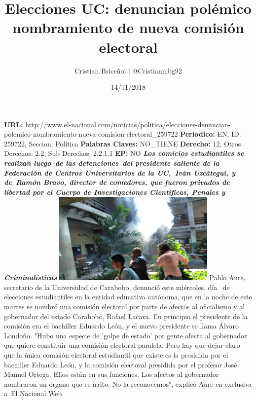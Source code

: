 \documentclass{article}%
\title{\textbf{Elecciones UC: denuncian polémico nombramiento de nueva comisión electoral}}%
\author{Cristian Briceñoi | @Cristianmbg92}%
\date{14/11/2018}%
\begin{document}
%
\normalsize%
\maketitle%
\textbf{URL: }%
http://www.el{-}nacional.com/noticias/politica/elecciones{-}denuncian{-}polemico{-}nombramiento{-}nueva{-}comision{-}electoral\_259722\newline%
%
\textbf{Periodico: }%
EN, %
ID: %
259722, %
Seccion: %
Política\newline%
%
\textbf{Palabras Claves: }%
NO\_TIENE\newline%
%
\textbf{Derecho: }%
12, %
Otros Derechos: %
2.2, %
Sub Derechos: %
2.2.1.1\newline%
%
\textbf{EP: }%
NO\newline%
\newline%
%
\textbf{\textit{Los comicios estudiantiles se realizan luego~de las detenciones~del presidente saliente de la Federación de Centros Universitarios de la UC,~Iván Uzcátegui, y de~Ramón Bravo, director de comedores, que fueron privados de libertad por el Cuerpo de Investigaciones Científicas, Penales y Criminalísticas}}%
\newline%
\newline%
%
\includegraphics[width=300px]{166.jpg}%
\newline%
%
Pablo Aure, secretario de la Universidad de Carabobo, denunció este miércoles, día~ de elecciones estudiantiles en la entidad educativa autónoma, que en la noche de este martes se nombró una comisión electoral por parte de afectos al oficialismo y al gobernador del estado Carabobo, Rafael Lacava.%
\newline%
%
En principio el presidente de la comisión era el bachiller Eduardo León, y el nuevo presidente se llama Álvaro Londoño.%
\newline%
%
"Hubo una especie de 'golpe de estado' por gente afecta al gobernador que quiere constituir una comisión electoral paralela. Pero hay que dejar claro que la única comisión electoral estudiantil que existe es la presidida por el bachiller Eduardo León, y la comisión electoral presidida por el profesor José Manuel Ortega. Ellos están en sus funciones. Los afectos al gobernador nombraron un órgano que es írrito. No la reconocemos", explicó Aure en exclusiva a~El Nacional Web.%
\end{document}

